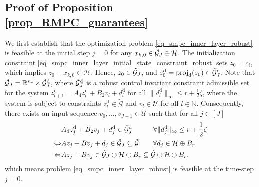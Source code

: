\documentclass{IEEEtran}
\begin{document}
\begin{appendices}
\section{Proof of Proposition \ref{prop_RMPC_guarantees}}
\label{proof_prop_RMPC_guarantees}
We first establish that the optimization problem \eqref{eq_smpc_inner_layer_robust} is feasible at the initial step $j=0$ for any $x_{k,0} \in \Tilde{\mathcal{G}}_{J} \ominus \mathcal{H}$. The initialization constraint \eqref{eq_smpc_inner_layer_initial_state_constraint_robust} sets $z_0=c_i$, which implies $z_0-x_{k,0}\in\mathcal{H}$. Hence, $z_{0}\in\Tilde{\mathcal{G}}_{J}$, and $z_{0}^{\text{d}}=\text{proj}_{\text{d}}(z_0)\in\Tilde{\mathcal{G}}_J^{\text{d}}$. Note that $\Tilde{\mathcal{G}}_{J}=\mathbb{R}^{n_{\text{s}}}\times\Tilde{\mathcal{G}}_{J}^{\text{d}}$, where $\Tilde{\mathcal{G}}_{J}^{\text{d}}$ is a robust control invariant constraint admissible set for the system 
    $z_{l+1}^{\text{d}} = A_4z_{l}^{\text{d}} + B_2v_{l} + d_{l}^{\text{d}}$ for all $\|d_{l}^{\text{d}}\|_{\infty}\leq r+ \frac{1}{2}\zeta$, where the system is subject to constraints $z_{l}^{\text{d}}\in\tilde{\mathcal{G}}$ and $v_{l}\in\mathcal{U}$ for all $l\in\mathbb{N}$. Consequently, there exists an input sequence $v_{0},\dots, v_{J-1}\in\mathcal{U}$ such that for all $j\in[J]$
\begin{align}%
    &A_4z^{\text{d}}_{j}+B_2v_{j}+d_{j}^{\text{d}}\in\Tilde{\mathcal{G}}^{\text{d}}_J  \ \ \ \qquad \forall \|d_{j}^{\text{d}}\|_{\infty}\leq r+\frac{1}{2}\zeta
    \\ \Leftrightarrow    &Az_{j}+Bv_{j}+d_{j}\in\Tilde{\mathcal{G}}_J\subseteq\Tilde{\mathcal{G}}  \qquad \forall d_{j}\in\mathcal{H}\oplus B_r
    \\ \Leftrightarrow
    &Az_{j}+Bv_{j}\in\Tilde{\mathcal{G}}_J\ominus\mathcal{H}\ominus B_r\subseteq\Tilde{\mathcal{G}}\ominus\mathcal{H}\ominus B_r,
\end{align}
which means problem \eqref{eq_smpc_inner_layer_robust} is feasible at the time-step $j=0$.


\end{appendices}
\end{document}

